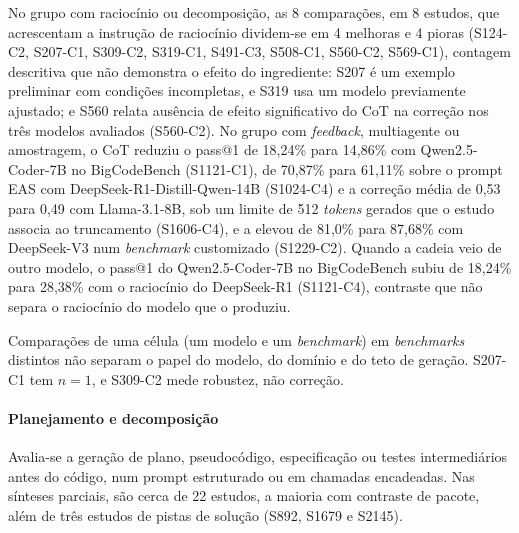 No grupo com raciocínio ou decomposição, as 8 comparações, em 8 estudos, que acrescentam a instrução de raciocínio dividem-se em 4 melhoras e 4 pioras (S124-C2, S207-C1, S309-C2, S319-C1, S491-C3, S508-C1, S560-C2, S569-C1), contagem descritiva que não demonstra o efeito do ingrediente: S207 é um exemplo preliminar com condições incompletas, e S319 usa um modelo previamente ajustado; e S560 relata ausência de efeito significativo do CoT na correção nos três modelos avaliados (S560-C2).
No grupo com \textit{feedback}, multiagente ou amostragem, o CoT reduziu o pass@1 de 18,24\% para 14,86\% com Qwen2.5-Coder-7B no BigCodeBench (S1121-C1), de 70,87\% para 61,11\% sobre o prompt EAS com DeepSeek-R1-Distill-Qwen-14B (S1024-C4) e a correção média de 0,53 para 0,49 com Llama-3.1-8B, sob um limite de 512 \textit{tokens} gerados que o estudo associa ao truncamento (S1606-C4), e a elevou de 81,0\% para 87,68\% com DeepSeek-V3 num \textit{benchmark} customizado (S1229-C2).
Quando a cadeia veio de outro modelo, o pass@1 do Qwen2.5-Coder-7B no BigCodeBench subiu de 18,24\% para 28,38\% com o raciocínio do DeepSeek-R1 (S1121-C4), contraste que não separa o raciocínio do modelo que o produziu.

Comparações de uma célula (um modelo e um \textit{benchmark}) em \textit{benchmarks} distintos não separam o papel do modelo, do domínio e do teto de geração. S207-C1 tem $n = 1$, e S309-C2 mede robustez, não correção.

\paragraph{Planejamento e decomposição}
Avalia-se a geração de plano, pseudocódigo, especificação ou testes intermediários antes do código, num prompt estruturado ou em chamadas encadeadas. Nas sínteses parciais, são cerca de 22 estudos, a maioria com contraste de pacote, além de três estudos de pistas de solução (S892, S1679 e S2145).


